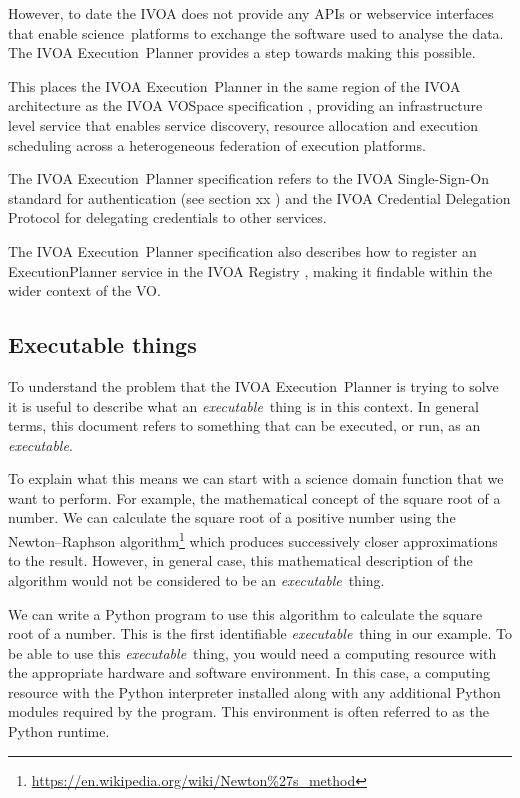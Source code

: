 \documentclass[11pt,a4paper]{ivoa}
\newcommand{\webservice} {webservice}
\newcommand{\ivoa} {IVOA}
\newcommand{\vospace} {VOSpace}
\newcommand{\execplanner} {ExecutionPlanner}
\newcommand{\executionplanner} {Execution~Planner}
\newcommand{\python} {Python}
\newcommand{\pythonprogram} {Python program}
\newcommand{\footurl}[1] {\footnote{\url{#1}}}
\newcommand{\scienceplatform} {science~platform}
\newcommand{\executable} {\textit{executable}}
\newcommand{\executablething} {\textit{executable}~thing}
\begin{document}
However, to date the \ivoa{} does not provide any APIs or \webservice{} interfaces that
enable \scienceplatform{}s to exchange the software used to analyse the data.
The \ivoa{} \executionplanner{} provides a step towards making this possible.

This places the \ivoa{} \executionplanner{} in the same region of the \ivoa{} architecture
as the \ivoa{} \vospace{} specification \citep{2009ivoa.specQ1007G},
providing an infrastructure level service that enables service discovery,
resource allocation and execution scheduling across a heterogeneous federation
of execution platforms.

The \ivoa{} \executionplanner{} specification refers to the
\ivoa{} Single-Sign-On standard \citep{2017ivoa.spec.0524T}
for authentication (see section xx )%
and the
\ivoa{} Credential Delegation Protocol \citep{2010ivoa.spec.0218P}
for delegating credentials to other services.

The \ivoa{} \executionplanner{} specification also describes how to register
an \execplanner{} service in the
\ivoa{} Registry \citep{2009ivoa.spec.1104B},
making it findable within the wider context of the VO.

\subsection{Executable things}
\label{executablething}

To understand the problem that the \ivoa{} \executionplanner{} is trying to solve
it is useful to describe what an \executablething{} is in this context.
In general terms, this document refers to something that can be executed, or run,
as an \executable.

To explain what this means we can start with a science domain function that we want to perform.
For example, the mathematical concept of the square root of a number.
We can calculate the square root of a positive number using the Newton–Raphson
algorithm\footurl{https://en.wikipedia.org/wiki/Newton\%27s_method}
which produces successively closer approximations to the result.
However, in general case, this mathematical description of the algorithm would not be
considered to be an \executablething.

We can write a \pythonprogram{} to use this algorithm to calculate the square root of a number.
This is the first identifiable \executablething{} in our example.
To be able to use this \executablething{}, you would need a computing resource with the appropriate
hardware and software environment. In this case, a computing resource with the \python{} interpreter
installed along with any additional \python{} modules required by the program.
This environment is often referred to as the \python{} runtime.
\end{document}
